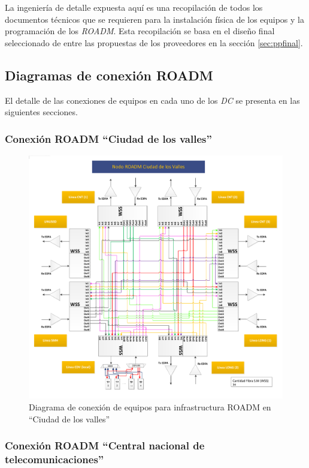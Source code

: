 La ingeniería de detalle expuesta aquí es una recopilación de todos
los documentos técnicos que se requieren para la instalación física de
los equipos y la programación de los \emph{ROADM}. Esta recopilación
se basa en el diseño final seleccionado de entre las propuestas de los
proveedores en la sección \ref{sec:ppfinal}.

\subsection{Diagramas de conexión ROADM}
\label{sec:diagramasroadm}

El detalle de las conexiones de equipos en cada uno de los \emph{DC}
se presenta en las siguientes secciones.

\subsubsection{Conexión ROADM ``Ciudad de los valles''}
\label{sec:drcdv}

\begin{figure}[H]
  \centering
  \includegraphics[width=17cm]{Imagenes/CDV.pdf}
  \caption{Diagrama de conexión de equipos para infrastructura ROADM en ``Ciudad de los valles''}
  \label{fig:drcdv}
\end{figure}

\subsubsection{Conexión ROADM ``Central nacional de telecomunicaciones''}
\label{sec:drcnt}

